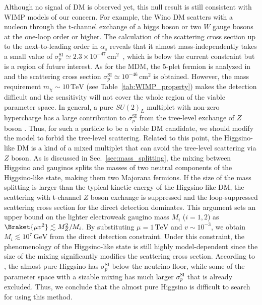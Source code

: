 \documentclass[12pt,twoside,book]{article}
\begin{document}
Although no signal of DM is observed yet, this null result is still consistent with WIMP models of our concern.
For example, the Wino DM scatters with a nucleon through the t-channel exchange of a higgs boson or two $W$ gauge bosons at the one-loop order or higher.
The calculation of the scattering cross section up to the next-to-leading order in $\alpha_s$ reveals that it almost mass-independently takes a small value of $\sigma_p^{\mathrm{SI}} \simeq 2.3 \times 10^{-47}\,\mathrm{cm}^2$~\cite{Hisano:2015rsa}, which is below the current constraint but is a region of future interest.
As for the MDM, the $5$-plet fermion is analyzed in \cite{Hisano:2011cs} and the scattering cross section $\sigma_p^{\mathrm{SI}} \simeq 10^{-46}\,\mathrm{cm}^2$ is obtained.
However, the mass requirement $m_\chi \sim 10\,\mathrm{TeV}$ (see Table~\ref{tab:WIMP_property}) makes the detection difficult and the sensitivity will not cover the whole region of the viable parameter space.
In general, a pure $SU(2)_L$ multiplet with non-zero hypercharge has a large contribution to $\sigma_p^{\mathrm{SI}}$ from the tree-level exchange of $Z$ boson \cite{Farina:2013mla}.
Thus, for such a particle to be a viable DM candidate, we should modify the model to forbid the tree-level scattering.
Related to this point, the Higgsino-like DM is a kind of a mixed multiplet that can avoid the tree-level scattering via $Z$ boson.
As is discussed in Sec.~\ref{sec:mass_splitting}, the mixing between Higgsino and gauginos splits the masses of two neutral components of the Higgsino-like state, making them two Majorana fermions.
If the size of the mass splitting is larger than the typical kinetic energy of the Higgsino-like DM, the scattering with t-channel $Z$ boson exchange is suppressed and the loop-suppressed scattering cross section for the direct detection dominates.
This argument sets an upper bound on the lighter electroweak gaugino mass $M_i$ ($i=1,2$) as $\Braket{\mu v^2} \lesssim M_Z^2 / M_i$.
By substituting $\mu = 1\,\mathrm{TeV}$ and $v \sim 10^{-3}$, we obtain $M_i \lesssim 10^7\,\mathrm{GeV}$ from the direct detection constraint.
Under this constraint, the phenomenology of the Higgsino-like state is still highly model-dependent since the size of the mixing significantly modifies the scattering cross section.
According to \cite{Hisano:2012wm, Roszkowski:2014wqa}, the almost pure Higgsino has $\sigma_p^{\mathrm{SI}}$ below the neutrino floor, while some of the parameter space with a sizable mixing has much larger $\sigma_p^{\mathrm{SI}}$ that is already excluded.
Thus, we conclude that the almost pure Higgsino is difficult to search for using this method.
\end{document}
